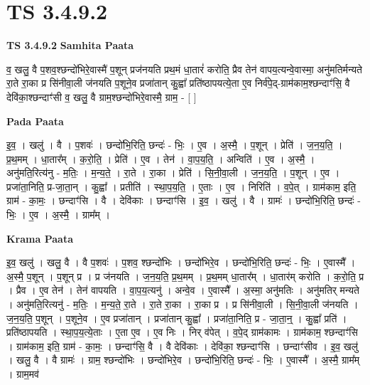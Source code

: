 \documentclass[17pt]{extarticle}
\begin{document}
\section{ TS 3.4.9.2 }

\textbf{TS 3.4.9.2 } \newline
\textbf{Samhita Paata} \newline

व॒ खलु॒ वै प॒शव॒श्छन्दो॑भिरे॒वास्मै॑ प॒शून् प्रज॑नयति प्रथ॒मं धा॒तारं॑ करोति॒ प्रैव तेन॑ वापय॒त्यन्वे॒वास्मा॒ अनु॑मतिर्मन्यते रा॒ते रा॒का प्र सि॑नीवा॒ली ज॑नयति प॒शूने॒व प्रजा॑तान् कु॒ह्वा᳚ प्रति॑ष्ठापयत्ये॒ता ए॒व निर्व॑पे॒द्-ग्राम॑काम॒श्छन्दाꣳ॑सि॒ वै देवि॑का॒श्छन्दाꣳ॑सी व॒ खलु॒ वै ग्राम॒श्छन्दो॑भिरे॒वास्मै॒ ग्राम॒ - [  ] \newline

\textbf{Pada Paata} \newline

इ॒व॒ । खलु॑ । वै । प॒शवः॑ । छन्दो॑भि॒रिति॒ छन्दः॑ - भिः॒ । ए॒व । अ॒स्मै॒ । प॒शून् । प्रेति॑ । ज॒न॒य॒ति॒ । प्र॒थ॒मम् । धा॒तार᳚म् । क॒रो॒ति॒ । प्रेति॑ । ए॒व । तेन॑ । वा॒प॒य॒ति॒ । अन्विति॑ । ए॒व । अ॒स्मै॒ । अनु॑मति॒रित्य॑नु - म॒तिः॒ । म॒न्य॒ते॒ । रा॒ते । रा॒का । प्रेति॑ । सि॒नी॒वा॒ली । ज॒न॒य॒ति॒ । प॒शून् । ए॒व । प्रजा॑ता॒निति॒ प्र-जा॒ता॒न् । कु॒ह्वा᳚ । प्रतीति॑ । स्था॒प॒य॒ति॒ । ए॒ताः । ए॒व । निरिति॑ । व॒पे॒त् । ग्राम॑काम॒ इति॒ ग्राम॑ - का॒मः॒ । छन्दाꣳ॑सि । वै । देवि॑काः । छन्दाꣳ॑सि । इ॒व॒ । खलु॑ । वै । ग्रामः॑ । छन्दो॑भि॒रिति॒ छन्दः॑ - भिः॒ । ए॒व । अ॒स्मै॒ । ग्राम᳚म् ।  \newline


\textbf{Krama Paata} \newline

इ॒व॒ खलु॑ । खलु॒ वै । वै प॒शवः॑ । प॒शव॒ श्छन्दो॑भिः । छन्दो॑भिरे॒व । छन्दो॑भि॒रिति॒ छन्दः॑ - भिः॒ । ए॒वास्मै᳚ । अ॒स्मै॒ प॒शून् । प॒शून् प्र । प्र ज॑नयति । ज॒न॒य॒ति॒ प्र॒थ॒मम् । प्र॒थ॒मम् धा॒तार᳚म् । धा॒तार॑म् करोति । क॒रो॒ति॒ प्र । प्रैव । ए॒व तेन॑ । तेन॑ वापयति । वा॒प॒य॒त्यनु॑ । अन्वे॒व । ए॒वास्मै᳚ । अ॒स्मा॒ अनु॑मतिः । अनु॑मतिर् मन्यते । अनु॑मति॒रित्यनु॑ - म॒तिः॒ । म॒न्य॒ते॒ रा॒ते । रा॒ते रा॒का । रा॒का प्र । प्र सि॑नीवा॒ली । सि॒नी॒वा॒ली ज॑नयति । ज॒न॒य॒ति॒ प॒शून् । प॒शूने॒व । ए॒व प्रजा॑तान् । प्रजा॑तान् कु॒ह्वा᳚ । प्रजा॑ता॒निति॒ प्र - जा॒ता॒न्॒ । कु॒ह्वा᳚ प्रति॑ । प्रति॑ष्ठापयति । स्था॒प॒य॒त्ये॒ताः । ए॒ता ए॒व । ए॒व निः । निर् व॑पेत् । व॒पे॒द् ग्राम॑कामः । ग्राम॑काम॒ श्छन्दाꣳ॑सि । ग्राम॑काम॒ इति॒ ग्राम॑ - का॒मः॒ । छन्दाꣳ॑सि॒ वै । वै देवि॑काः । देवि॑का॒ श्छन्दाꣳ॑सि । छन्दाꣳ॑सीव । इ॒व॒ खलु॑ । खलु॒ वै । वै ग्रामः॑ । ग्राम॒ श्छन्दो॑भिः । छन्दो॑भिरे॒व । छन्दो॑भि॒रिति॒ छन्दः॑ - भिः॒ । ए॒वास्मै᳚ । अ॒स्मै॒ ग्राम᳚म् । ग्राम॒मव॑ \newline
\end{document}
